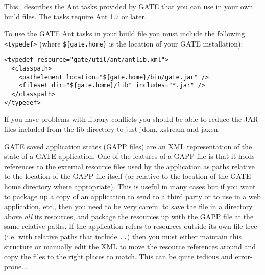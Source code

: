 \nnormalsize

This \chapthing\ describes the Ant tasks provided by GATE that you can use in
your own build files.  The tasks require Ant 1.7 or later.


To use the GATE Ant tasks in your build file you must include the following
\verb|<typedef>| (where \verb|${gate.home}| is the location of your GATE
installation):

\begin{small}
\begin{verbatim}
<typedef resource="gate/util/ant/antlib.xml">
  <classpath>
    <pathelement location="${gate.home}/bin/gate.jar" />
    <fileset dir="${gate.home}/lib" includes="*.jar" />
  </classpath>
</typedef>
\end{verbatim}
\end{small}

If you have problems with library conflicts you should be able to reduce the
JAR files included from the lib directory to just jdom, xstream and jaxen.



GATE saved application states (GAPP files) are an XML representation of the
state of a GATE application.  One of the features of a GAPP file is that it
holds references to the external resource files used by the application as
paths relative to the location of the GAPP file itself (or relative to the
location of the GATE home directory where appropriate).  This is useful in many
cases but if you want to package up a copy of an application to send to a third
party or to use in a web application, etc., then you need to be very careful to
save the file in a directory above \emph{all} its resources, and package the
resources up with the GAPP file at the same relative paths.  If the application
refers to resources outside its own file tree (i.e. with relative paths that
include \texttt{..}) then you must either maintain this structure or manually
edit the XML to move the resource references around and copy the files to the
right places to match.  This can be quite tedious and error-prone...

